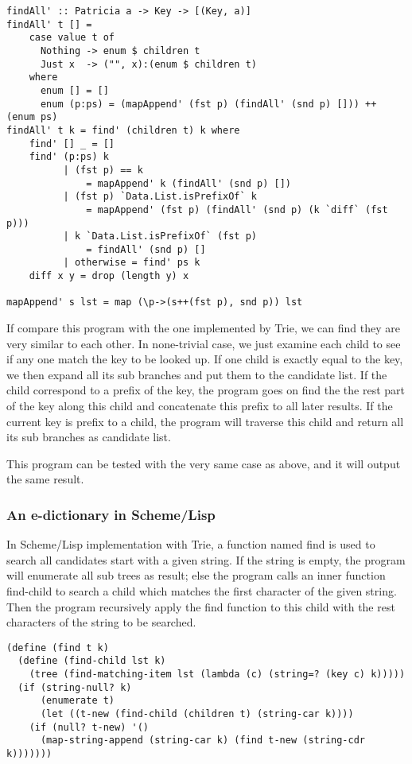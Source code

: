 \documentclass{article}
\begin{document}
\begin{lstlisting}
findAll' :: Patricia a -> Key -> [(Key, a)]
findAll' t [] =
    case value t of
      Nothing -> enum $ children t
      Just x  -> ("", x):(enum $ children t)
    where
      enum [] = []
      enum (p:ps) = (mapAppend' (fst p) (findAll' (snd p) [])) ++ (enum ps)
findAll' t k = find' (children t) k where
    find' [] _ = []
    find' (p:ps) k
          | (fst p) == k 
              = mapAppend' k (findAll' (snd p) [])
          | (fst p) `Data.List.isPrefixOf` k 
              = mapAppend' (fst p) (findAll' (snd p) (k `diff` (fst p)))
          | k `Data.List.isPrefixOf` (fst p) 
              = findAll' (snd p) []
          | otherwise = find' ps k
    diff x y = drop (length y) x

mapAppend' s lst = map (\p->(s++(fst p), snd p)) lst
\end{lstlisting}

If compare this program with the one implemented by Trie, we can find they are
very similar to each other. In none-trivial case, we just examine each child
to see if any one match the key to be looked up. If one child is exactly equal
to the key, we then expand all its sub branches and put them to the candidate list.
If the child correspond to a prefix of the key, the program goes on find the 
the rest part of the key along this child and concatenate this prefix to all 
later results. If the current key is prefix to a child, the program will traverse
this child and return all its sub branches as candidate list.

This program can be tested with the very same case as above, and it will output
the same result.

\subsubsection*{An e-dictionary in Scheme/Lisp}

In Scheme/Lisp implementation with Trie, a function named find is used
to search all candidates start with a given string. If the string is
empty, the program will enumerate all sub trees as result; else the
program calls an inner function find-child to search a child which
matches the first character of the given string. Then the program
recursively apply the find function to this child with the rest
characters of the string to be searched. 

\lstset{language=lisp}
\begin{lstlisting}
(define (find t k)
  (define (find-child lst k)
    (tree (find-matching-item lst (lambda (c) (string=? (key c) k)))))
  (if (string-null? k) 
      (enumerate t) 
      (let ((t-new (find-child (children t) (string-car k))))
	(if (null? t-new) '()
	  (map-string-append (string-car k) (find t-new (string-cdr k)))))))
\end{lstlisting}
\end{document}
